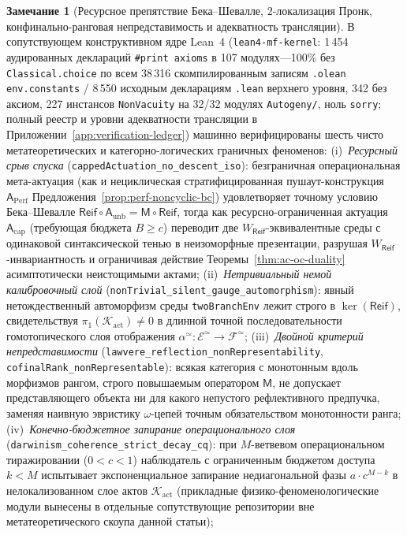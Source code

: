 \documentclass[11pt]{article}
\theoremstyle{plain}
\theoremstyle{definition}
\newtheorem{remark}[theorem]{Замечание}
\newcommand{\cF}{\mathcal{F}}
\newcommand{\cE}{\mathcal{E}}
\begin{document}
\begin{remark}[Ресурсное препятствие Бека--Шевалле, $2$-локализация Пронк, конфинально-ранговая непредставимость и адекватность трансляции]\label{rem:toe-frontier-obstructions}
В сопутствующем конструктивном ядре Lean~4 (\texttt{lean4-mf-kernel}: 1\,454 аудированных деклараций \texttt{\#print axioms} в 107 модулях---100\% без \texttt{Classical.choice} по всем 38\,316 скомпилированным записям \texttt{.olean} \texttt{env.constants} / 8\,550 исходным декларациям \texttt{.lean} верхнего уровня, 342 без аксиом, 227 инстансов \texttt{NonVacuity} на 32/32 модулях \texttt{Autogeny/}, ноль \texttt{sorry}; полный реестр и уровни адекватности трансляции в Приложении~\ref{app:verification-ledger}) машинно верифицированы шесть чисто метатеоретических и категорно-логических граничных феноменов:
(i)~\emph{Ресурсный срыв спуска} (\texttt{cappedActuation\_\allowbreak no\_\allowbreak descent\_\allowbreak iso}): безграничная операциональная мета-актуация (как и нециклическая стратифицированная пушаут-конструкция $\mathsf{A}_{\mathrm{Perf}}$ Предложения~\ref{prop:perf-noncyclic-bc}) удовлетворяет точному условию Бека--Шевалле $\mathsf{Reif}\circ\mathsf{A}_{\mathrm{unb}} = \mathsf{M}\circ\mathsf{Reif}$, тогда как ресурсно-ограниченная актуация $\mathsf{A}_{\mathrm{cap}}$ (требующая бюджета $B \ge c$) переводит две $W_{\mathsf{Reif}}$-эквивалентные среды с одинаковой синтаксической тенью в неизоморфные презентации, разрушая $W_{\mathsf{Reif}}$-инвариантность и ограничивая действие Теоремы~\ref{thm:ac-oc-duality} асимптотически неистощимыми актами;
(ii)~\emph{Нетривиальный немой калибровочный слой} (\texttt{nonTrivial\_\allowbreak silent\_\allowbreak gauge\_\allowbreak automorphism}): явный нетождественный автоморфизм среды \texttt{twoBranchEnv} лежит строго в $\ker(\mathsf{Reif})$, свидетельствуя $\pi_1(\mathcal{K}_{\mathrm{act}}) \neq 0$ в длинной точной последовательности гомотопического слоя отображения $\alpha^{\simeq} : \cE^{\simeq} \to \cF^{\simeq}$;
(iii)~\emph{Двойной критерий непредставимости} (\texttt{lawvere\_\allowbreak reflection\_\allowbreak nonRepresentability}, \texttt{cofinalRank\_\allowbreak nonRepresentable}): всякая категория с монотонным вдоль морфизмов рангом, строго повышаемым оператором $\mathsf{M}$, не допускает представляющего объекта ни для какого непустого рефлективного предпучка, заменяя наивную эвристику $\omega$-цепей точным обязательством монотонности ранга;
(iv)~\emph{Конечно-бюджетное запирание операционального слоя} (\texttt{darwinism\_\allowbreak coherence\_\allowbreak strict\_\allowbreak decay\_\allowbreak cq}): при $M$-ветвевом операциональном тиражировании ($0 < c < 1$) наблюдатель с ограниченным бюджетом доступа $k < M$ испытывает экспоненциальное запирание недиагональной фазы $a\cdot c^{M-k}$ в нелокализованном слое актов $\mathcal{K}_{\mathrm{act}}$ (прикладные физико-феноменологические модули вынесены в отдельные сопутствующие репозитории вне метатеоретического скоупа данной статьи);

\end{remark}
\end{document}
